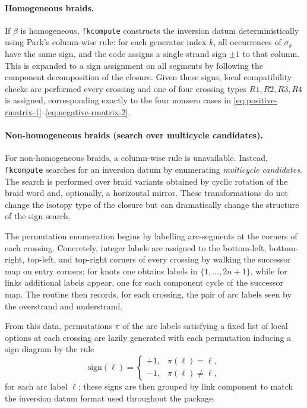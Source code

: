 \documentclass[twocolumn]{article}
\begin{document}
\paragraph{Homogeneous braids.}
If \(\beta\) is homogeneous, \texttt{fkcompute} constructs the inversion datum
deterministically using Park's column-wise rule: for each generator index
\(k\), all occurrences of \(\sigma_k\) have the same sign, and the code assigns a
single strand sign \(\pm 1\) to that column.
This is expanded to a sign assignment on all segments by following the component
decomposition of the closure.
Given these signs, local compatibility checks are performed 
every crossing and one of four crossing types \(R1,R2,R3,R4\) is assigned, 
corresponding exactly to the four nonzero cases in
\eqref{eq:positive-rmatrix-1}--\eqref{eq:negative-rmatrix-2}.

\paragraph{Non-homogeneous braids (search over multicycle candidates).}
For non-homogeneous braids, a column-wise rule is unavailable.
Instead, \texttt{fkcompute} searches for an inversion datum by enumerating
\emph{multicycle candidates}.
The search is performed over braid variants obtained by cyclic rotation of the
braid word and, optionally, a horizontal mirror.
These transformations do not change the isotopy type of the closure but can
dramatically change the structure of the sign search.

The permutation enumeration begins by labelling arc-segments at the corners of
each crossing.
Concretely, integer labels are assigned to the bottom-left,
bottom-right, top-left, and top-right corners of every crossing by walking the
successor map on entry corners; for knots one obtains labels in
\(\{1,\dots,2n+1\}\), while for links additional labels appear, one for each
component cycle of the successor map.
The routine then records, for each crossing, the pair of arc
labels seen by the overstrand and understrand.

From this data, permutations
\(\pi\) of the arc labels satisfying a fixed list of local options at each
crossing are lazily generated with each permutation inducing a sign diagram by the rule
\begin{equation}\label{eq:perm-to-signs}
  \text{sign}(\ell)=\begin{cases}
    +1, & \pi(\ell)=\ell,\\
    -1, & \pi(\ell)\neq \ell,
  \end{cases}
\end{equation}
for each arc label \(\ell\); these signs are then grouped by link component to match the inversion datum format used throughout the package.
\end{document}
